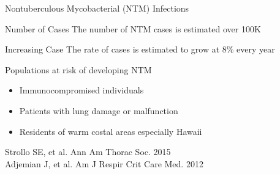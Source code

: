 \documentclass[11pt, xcolor=table]{beamer}
\begin{document}
	\begin{frame}{Nontuberculous Mycobacterial (NTM) Infections}
	  
		\begin{block}{Number of Cases}
		The number of NTM cases is estimated over 100K
		\end{block}
		
		\begin{block}{Increasing Case}
		The rate of cases is estimated to grow at 8\% every year
		\end{block}
		
		
		\begin{block}{Populations at risk of developing NTM}
		\begin{itemize}
		\item Immunocompromised individuals 
		\item Patients with lung damage or malfunction 
		\item Residents of warm costal areas especially Hawaii
		\end{itemize}
		\end{block} 
		
		\begin{block}
		
		\end{block}
	\vspace{-1cm}
	\tiny{Strollo SE, et al. Ann Am Thorac Soc. 2015 \\
	Adjemian J, et al. Am J Respir Crit Care Med. 2012}
	
	\end{frame}
	
\end{document}
